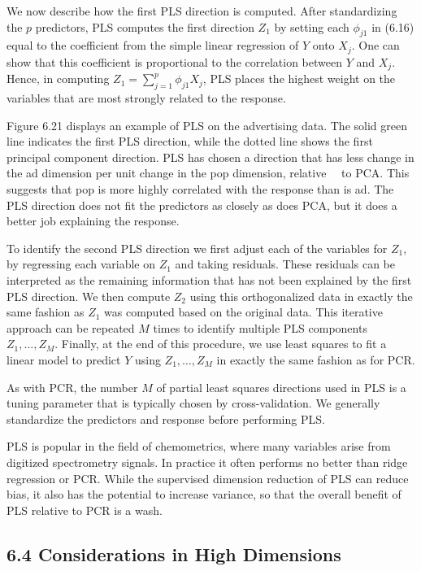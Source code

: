 \documentclass[10pt]{article}
\begin{document}
We now describe how the first PLS direction is computed. After standardizing the $p$ predictors, PLS computes the first direction $Z_{1}$ by setting each $\phi_{j 1}$ in (6.16) equal to the coefficient from the simple linear regression of $Y$ onto $X_{j}$. One can show that this coefficient is proportional to the correlation between $Y$ and $X_{j}$. Hence, in computing $Z_{1}=\sum_{j=1}^{p} \phi_{j 1} X_{j}$, PLS places the highest weight on the variables that are most strongly related to the response.

Figure 6.21 displays an example of PLS on the advertising data. The solid green line indicates the first PLS direction, while the dotted line shows the first principal component direction. PLS has chosen a direction that has less change in the ad dimension per unit change in the pop dimension, relative\
\
to PCA. This suggests that pop is more highly correlated with the response than is ad. The PLS direction does not fit the predictors as closely as does PCA, but it does a better job explaining the response.

To identify the second PLS direction we first adjust each of the variables for $Z_{1}$, by regressing each variable on $Z_{1}$ and taking residuals. These residuals can be interpreted as the remaining information that has not been explained by the first PLS direction. We then compute $Z_{2}$ using this orthogonalized data in exactly the same fashion as $Z_{1}$ was computed based on the original data. This iterative approach can be repeated $M$ times to identify multiple PLS components $Z_{1}, \ldots, Z_{M}$. Finally, at the end of this procedure, we use least squares to fit a linear model to predict $Y$ using $Z_{1}, \ldots, Z_{M}$ in exactly the same fashion as for PCR.

As with PCR, the number $M$ of partial least squares directions used in PLS is a tuning parameter that is typically chosen by cross-validation. We generally standardize the predictors and response before performing PLS.

PLS is popular in the field of chemometrics, where many variables arise from digitized spectrometry signals. In practice it often performs no better than ridge regression or PCR. While the supervised dimension reduction of PLS can reduce bias, it also has the potential to increase variance, so that the overall benefit of PLS relative to PCR is a wash.

\subsection*{6.4 Considerations in High Dimensions}
\end{document}
